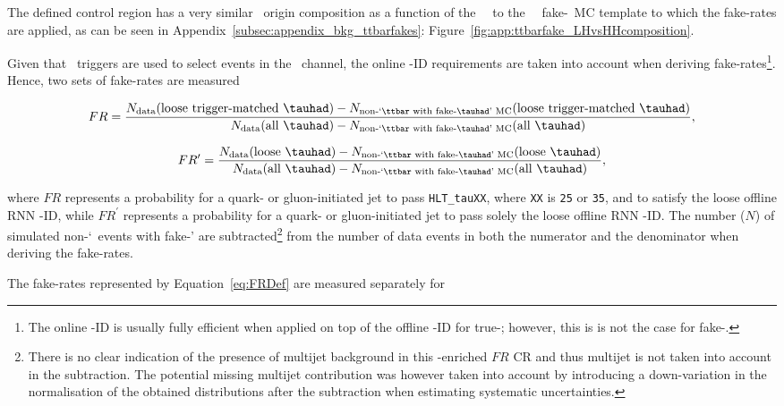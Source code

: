 The defined control region has a very similar \tauhad\ origin composition as a function of the \tauhad\ \pT\ to the \hadhad\ \ttbar\ fake-\tauhad\ MC template to which the fake-rates are applied, as can be seen in Appendix~\ref{subsec:appendix_bkg_ttbarfakes}: Figure~\ref{fig:app:ttbarfake_LHvsHHcomposition}.

Given that \tauhad\ triggers are used to select events in the \hadhad\ channel, the online \tauhad-ID requirements are taken into account when deriving fake-rates\footnote{The online \tauhad-ID is usually fully efficient when applied on top of the offline \tauhad-ID for true-\tauhad; however, this is is not the case for fake-\tauhad.}. Hence, two sets of fake-rates are measured

\begin{equation}
FR        = \frac{N_{\text{data}}(\text{loose trigger-matched }\tauhad) - N_{\text{non-`\ttbar\ with fake-\tauhad' MC}}(\text{loose trigger-matched }\tauhad)}{N_{\text{data}}(\text{all }\tauhad) - N_{\text{non-`\ttbar\ with fake-\tauhad' MC}}(\text{all }\tauhad)}, \label{eq:FRDef}
\end{equation}

\begin{equation}
FR^\prime = \frac{N_{\text{data}}(\text{loose }\tauhad) - N_{\text{non-`\ttbar\ with fake-\tauhad' MC}}(\text{loose }\tauhad)}{                                N_{\text{data}}(\text{all }\tauhad) - N_{\text{non-`\ttbar\ with fake-\tauhad' MC}}(\text{all }\tauhad)}, \label{eq:FRPrimeDef}
\end{equation}

where $FR$ represents a probability for a quark- or gluon-initiated jet to pass \verb|HLT_tauXX|, where \verb|XX| is \verb|25| or \verb|35|, and to satisfy the loose offline RNN \tauhad-ID, while $FR^\prime$ represents a probability for a quark- or gluon-initiated jet to pass solely the loose offline RNN \tauhad-ID. The number ($N$) of simulated non-`\ttbar\ events with fake-\tauhad' are subtracted\footnote{There is no clear indication of the presence of multijet background in this \ttbar-enriched $FR$ CR and thus multijet is not taken into account in the subtraction. The potential missing multijet contribution was however taken into account by introducing a down-variation in the normalisation of the obtained distributions after the subtraction when estimating systematic uncertainties.} from the number of data events in both the numerator and the denominator when deriving the fake-rates. 

The fake-rates represented by Equation~\eqref{eq:FRDef} are measured separately for


